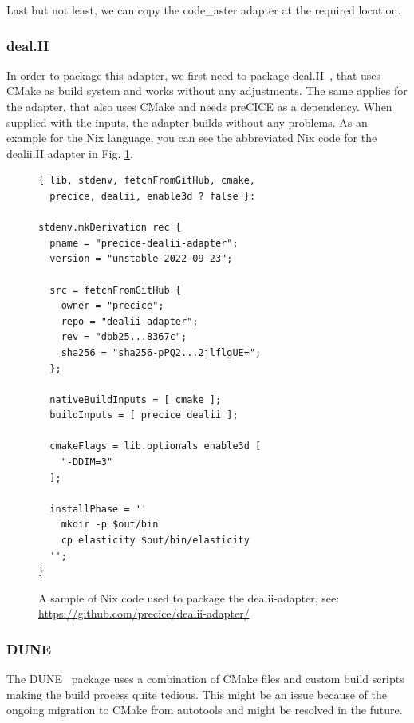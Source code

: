 \documentclass{eceasst}
\begin{document}
Last but not least, we can copy the code\_aster adapter at the required location.\\

\subsubsection{deal.II}

In order to package this adapter, we first need to package deal.II~\cite{dealII95}, that uses CMake as build system and works without any adjustments.
The same applies for the adapter, that also uses CMake and needs preCICE as a dependency.
When supplied with the inputs, the adapter builds without any problems.
As an example for the Nix language, you can see the abbreviated Nix code for the dealii.II adapter in Fig. \ref{lst:dealii-adapter-nix}.\\

\begin{figure}
    \normalsize
    \begin{verbatim}
{ lib, stdenv, fetchFromGitHub, cmake,
  precice, dealii, enable3d ? false }:

stdenv.mkDerivation rec {
  pname = "precice-dealii-adapter";
  version = "unstable-2022-09-23";

  src = fetchFromGitHub {
    owner = "precice";
    repo = "dealii-adapter";
    rev = "dbb25...8367c";
    sha256 = "sha256-pPQ2...2jlflgUE=";
  };

  nativeBuildInputs = [ cmake ];
  buildInputs = [ precice dealii ];

  cmakeFlags = lib.optionals enable3d [
    "-DDIM=3"
  ];

  installPhase = ''
    mkdir -p $out/bin
    cp elasticity $out/bin/elasticity
  '';
}
    \end{verbatim}
    \caption{A sample of Nix code used to package the dealii-adapter, see: \url{https://github.com/precice/dealii-adapter/}}
    \label{lst:dealii-adapter-nix}
    \hrulefill
    \vspace*{4pt}
\end{figure}

\subsubsection{DUNE}

The DUNE~\cite{bastian2020dune} package uses a combination of CMake files and custom build scripts making the build process quite tedious.
This might be an issue because of the ongoing migration to CMake from autotools and might be resolved in the future.
\end{document}
